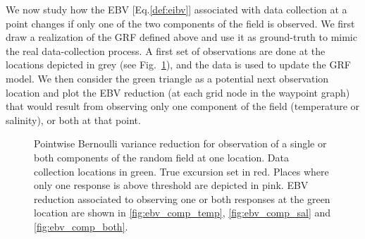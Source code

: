 \documentclass[aoas,preprint]{imsart}
\begin{document}
We now study how the EBV [Eq.\eqref{def:eibv}] associated with data
collection at a point changes if only one of the two components of the
field is observed. We first draw a realization of the GRF defined
above and use it as ground-truth to mimic the real data-collection
process. A first set of observations are done at the locations
depicted in grey (see Fig.~\ref{fig:ebv_comp}), and the data is used
to update the GRF model. We then consider the green triangle as a
potential next observation location and plot the EBV reduction (at
each grid node in the waypoint graph) that would result from observing
only one component of the field (temperature or salinity), or both at
that point.

\begin{figure}[!b] 
\centering 
{}
\caption{Pointwise Bernoulli variance reduction for observation of a
  single or both components of the random field at one location. Data
  collection locations in green. True excursion set in red. Places
  where only one response is above threshold are depicted in pink. EBV
  reduction associated to observing one or both responses at the green
  location are shown in \ref{fig:ebv_comp_temp},
  \ref{fig:ebv_comp_sal} and \ref{fig:ebv_comp_both}.}
\label{fig:ebv_comp}
\end{figure}
\end{document}
